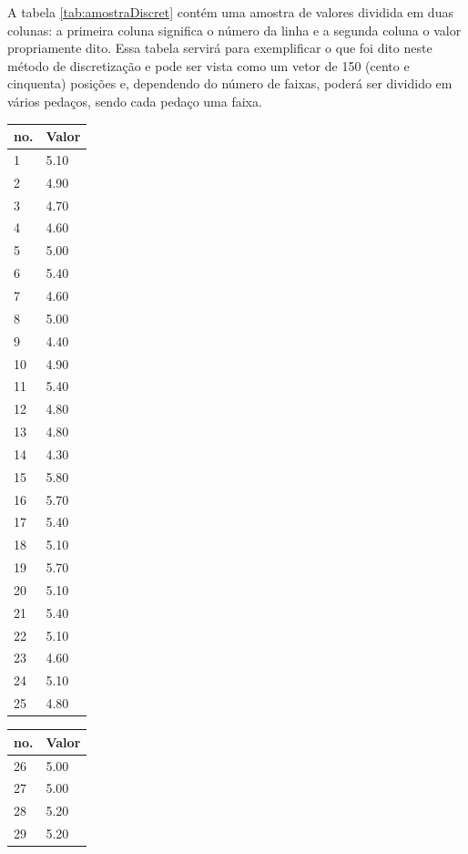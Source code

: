 A tabela \ref{tab:amostraDiscret} contém uma amostra de valores dividida em duas colunas: a primeira coluna significa o número da linha e a segunda coluna o valor propriamente dito. Essa tabela servirá para exemplificar o que foi dito neste método de discretização e pode ser vista como um vetor de 150 (cento e cinquenta) posições e, dependendo do número de faixas, poderá ser dividido em vários pedaços, sendo cada pedaço uma faixa. 

\begin{table}[!ht]
\centering

\begin{tabular}{|l|l|}
\hline 
 no. & Valor \\ \hline
1	&	5.10	\\ \hline
2	&	4.90	\\ \hline
3	&	4.70	\\ \hline
4	&	4.60	\\ \hline
5	&	5.00	\\ \hline
6	&	5.40	\\ \hline
7	&	4.60	\\ \hline
8	&	5.00	\\ \hline
9	&	4.40	\\ \hline
10	&	4.90	\\ \hline
11	&	5.40	\\ \hline
12	&	4.80	\\ \hline
13	&	4.80	\\ \hline
14	&	4.30	\\ \hline
15	&	5.80	\\ \hline
16	&	5.70	\\ \hline
17	&	5.40	\\ \hline
18	&	5.10	\\ \hline
19	&	5.70	\\ \hline
20	&	5.10	\\ \hline
21	&	5.40	\\ \hline
22	&	5.10	\\ \hline
23	&	4.60	\\ \hline
24	&	5.10	\\ \hline
25	&	4.80	\\ \hline
\end{tabular}
\begin{tabular}{ |l|l| }
\hline
 no. & Valor \\ \hline
26	&	5.00	\\ \hline
27	&	5.00	\\ \hline
28	&	5.20	\\ \hline
29	&	5.20	\\ \hline

\end{tabular}
\end{table}
